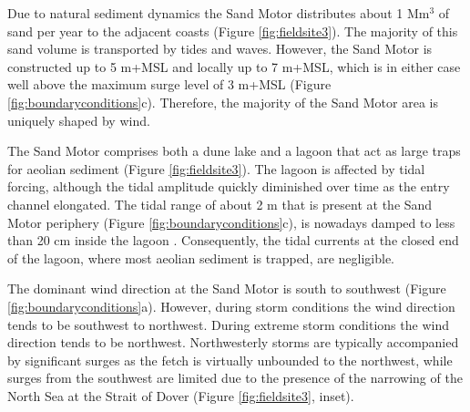 \documentclass[preprint,12pt,authoryear]{elsarticle}
\begin{document}
Due to natural sediment dynamics the Sand Motor distributes about 1
$\mathrm{Mm^3}$ of sand per year to the adjacent coasts (Figure
\ref{fig:fieldsite3}). The majority of this sand volume is transported
by tides and waves. However, the Sand Motor is constructed up to 5
m+MSL and locally up to 7 m+MSL, which is in either case well above
the maximum surge level of 3 m+MSL (Figure
\ref{fig:boundaryconditions}c). Therefore, the majority of the Sand
Motor area is uniquely shaped by wind.

The Sand Motor comprises both a dune lake and a lagoon that act as
large traps for aeolian sediment (Figure \ref{fig:fieldsite3}). The
lagoon is affected by tidal forcing, although the tidal amplitude
quickly diminished over time as the entry channel elongated. The tidal
range of about 2 m that is present at the Sand Motor periphery (Figure
\ref{fig:boundaryconditions}c), is nowadays damped to less than 20 cm
inside the lagoon \citep{deVries2015}. Consequently, the tidal
currents at the closed end of the lagoon, where most aeolian sediment
is trapped, are negligible.

The dominant wind direction at the Sand Motor is south to southwest
(Figure \ref{fig:boundaryconditions}a). However, during storm
conditions the wind direction tends to be southwest to
northwest. During extreme storm conditions the wind direction tends to
be northwest. Northwesterly storms are typically accompanied by
significant surges as the fetch is virtually unbounded to the
northwest, while surges from the southwest are limited due to the
presence of the narrowing of the North Sea at the Strait of Dover
(Figure \ref{fig:fieldsite3}, inset).
\end{document}
